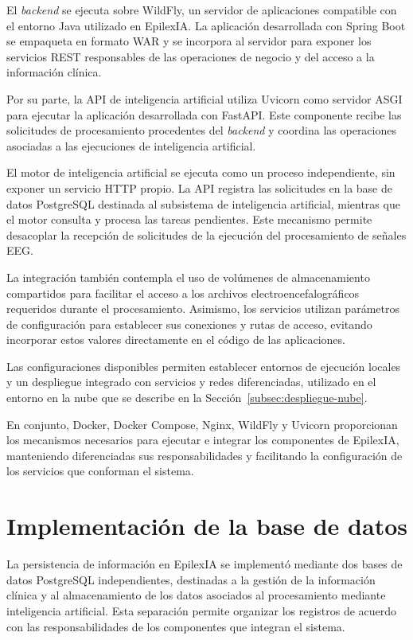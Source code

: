 El \textit{backend} se ejecuta sobre WildFly, un servidor de aplicaciones
compatible con el entorno Java utilizado en EpilexIA. La
aplicación desarrollada con Spring Boot se empaqueta en formato
WAR y se incorpora al servidor para exponer los servicios REST
responsables de las operaciones de negocio y del acceso a la
información clínica.

Por su parte, la API de inteligencia artificial utiliza Uvicorn
como servidor ASGI para ejecutar la aplicación desarrollada con
FastAPI. Este componente recibe las solicitudes de procesamiento
procedentes del \textit{backend} y coordina las operaciones asociadas a
las ejecuciones de inteligencia artificial.

El motor de inteligencia artificial se ejecuta como un proceso
independiente, sin exponer un servicio HTTP propio. La API registra las solicitudes en la base de datos PostgreSQL destinada al
subsistema de inteligencia artificial, mientras que el motor
consulta y procesa las tareas pendientes. Este mecanismo permite desacoplar la recepción de solicitudes de la ejecución
del procesamiento de señales EEG.

La integración también contempla el uso de volúmenes de
almacenamiento compartidos para facilitar el acceso a los
archivos electroencefalográficos requeridos durante el
procesamiento. Asimismo, los servicios utilizan parámetros
de configuración para establecer sus conexiones y rutas de
acceso, evitando incorporar estos valores directamente en
el código de las aplicaciones.

Las configuraciones disponibles permiten establecer entornos de ejecución locales y un despliegue integrado con servicios y redes diferenciadas, utilizado en el entorno en la nube que se describe en la Sección~\ref{subsec:despliegue-nube}.

En conjunto, Docker, Docker Compose, Nginx, WildFly y Uvicorn
proporcionan los mecanismos necesarios para ejecutar e integrar
los componentes de EpilexIA, manteniendo diferenciadas sus
responsabilidades y facilitando la configuración de los
servicios que conforman el sistema.


\section{Implementación de la base de datos}

La persistencia de información en EpilexIA se implementó mediante
dos bases de datos PostgreSQL independientes, destinadas a la
gestión de la información clínica y al almacenamiento de los
datos asociados al procesamiento mediante inteligencia
artificial. Esta separación permite organizar los registros
de acuerdo con las responsabilidades de los componentes que
integran el sistema.

